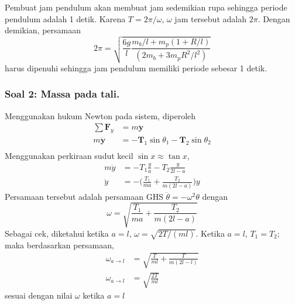 \documentclass[../../../main.tex]{subfiles}
\begin{document}
  Pembuat jam pendulum akan membuat jam sedemikian rupa sehingga periode pendulum adalah 1 detik. Karena $T=2\pi/\omega$, $\omega$ jam tersebut adalah $2\pi$. Dengan demikian, persamaan
  \begin{equation*}
    2\pi=\sqrt{\frac{6g}{l}\frac{m_b/l+m_p(1+R/l)}{(2m_b+3m_pR^2/l^2)}}
  \end{equation*}
  harus dipenuhi sehingga jam pendulum memiliki periode sebesar 1 detik.
  
  \subsubsection{Soal 2: Massa pada tali.} Menggunakan hukum Newton pada sistem, diperoleh
  \begin{align*}
    \sum \mathbf{F}_y&=m\boldsymbol{\ddot{y}}\\
    m\boldsymbol{\ddot{y}}&=-\mathbf{T}_1\sin\theta_1-\mathbf{T}_2\sin\theta_2\\
  \end{align*}
  Menggunakan perkiraan sudut kecil $\sin x\approx\tan x$,
  \begin{align*}
    m\ddot{y}&=-{T}_1\frac{y}{a}-{T}_2\frac{y}{2l-a}\\
    \ddot{y}&=-\biggl(\frac{{T}_1}{ma}+\frac{{T}_2}{m(2l-a)}\biggr)y
  \end{align*}
  Persamaan tersebut adalah persamaan GHS $\ddot{\theta}=-\omega^2\theta$ dengan 
  \begin{equation*}
    \omega=\sqrt{\frac{{T}_1}{ma}+\frac{{T}_2}{m(2l-a)}}
  \end{equation*}
  Sebagai cek, diketahui ketika $a=l$, $\omega=\sqrt{2T/(ml)}$. Ketika $a=l$, $T_1=T_2$; maka berdasarkan persamaan,
  \begin{align*}
    \omega_{a\rightarrow l}&=\sqrt{\frac{{T}}{ml}+\frac{{T}}{m(2l-l)}}\\
    \omega_{a\rightarrow l}&=\sqrt{\frac{2T}{ml}}
  \end{align*}
  sesuai dengan nilai $\omega$ ketika $a=l$
\end{document}
